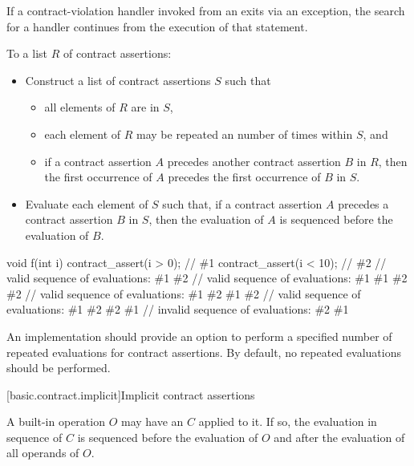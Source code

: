 \begin{note}
If a contract-violation handler
invoked from an 
exits via an exception,
the search for a handler
continues from the execution of that statement.
\end{note}

\pnum
To  a list $R$ of contract assertions:
\begin{itemize}
\item
Construct a list of contract assertions $S$ such that
\begin{itemize}
\item
all elements of $R$ are in $S$,
\item
each element of $R$
may be repeated an
number of times
within $S$, and
\item
if a contract assertion $A$
precedes another contract assertion $B$
in $R$,
then the
first occurrence of $A$
precedes the first occurrence of $B$
in $S$.
\end{itemize}
\item
Evaluate each element of $S$ such that,
if a contract assertion $A$
precedes a contract assertion $B$
in $S$,
then the evaluation of $A$
is sequenced before
the evaluation of $B$.
\end{itemize}

\begin{example}
\begin{codeblock}
void f(int i)
{
  contract_assert(i > 0);   // \#1
  contract_assert(i < 10);  // \#2
    // valid sequence of evaluations: \#1 \#2
    // valid sequence of evaluations: \#1 \#1 \#2 \#2
    // valid sequence of evaluations: \#1 \#2 \#1 \#2
    // valid sequence of evaluations: \#1 \#2 \#2 \#1
    // invalid sequence of evaluations: \#2 \#1
}
\end{codeblock}
\end{example}

\pnum
\recommended
An implementation should
provide an option to perform
a specified number of repeated evaluations
for contract assertions.
By default,
no repeated evaluations should be performed.

[basic.contract.implicit]{Implicit contract assertions}

\pnum
A built-in operation $O$
may have an
 $C$ applied to it.
If so,
the evaluation in sequence of $C$
is sequenced before
the evaluation of $O$ and
after the evaluation of
all operands of $O$.

